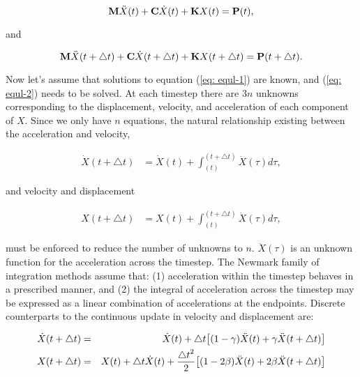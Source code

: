 \begin{equation}
{\bf M} \ddot{X}(t) + {\bf C} \dot{X}(t) + {\bf K} {X}(t) = {\bf P}(t),
\label{eq: equl-1}
\end{equation}

\vspace{0.01 in}\noindent
and

\begin{equation}
{\bf M} \ddot{X}(t+\triangle t) + {\bf C} \dot{X}(t+\triangle t) +
{\bf K}      {X}(t+\triangle t) = {\bf P}(t+\triangle t).
\label{eq: equl-2}
\end{equation}

\vspace{0.05 in}\noindent
Now let's assume that solutions to equation (\ref{eq: equl-1}) are known,
and (\ref{eq: equl-2}) needs to be solved.
At each timestep there are $3n$ unknowns corresponding to
the displacement, velocity, and acceleration of each component of $X$.
Since we only have $n$ equations, the natural relationship existing between the
acceleration and velocity,

\begin{eqnarray}
{\dot X} (t+\triangle t) &= {\dot X}(t) + \int_{(t)}^{(t+\triangle t)} {\ddot X}(\tau) d \tau,
\end{eqnarray}

\vspace{0.05 in}\noindent
and velocity and displacement

\begin{eqnarray}
{X} (t+\triangle t) &= {X}(t) + \int_{(t)}^{(t+\triangle t)} {\dot  X}(\tau) d \tau,
\end{eqnarray}

\vspace{0.05 in}\noindent
must be enforced to reduce the number of unknowns to $n$.
${\ddot X}(\tau)$ is an unknown function for the acceleration across the timestep.
The Newmark family of integration methods assume that:
(1) acceleration within the timestep behaves in a prescribed manner, and
(2) the integral of acceleration across the timestep may be expressed
as a linear combination of accelerations at the endpoints.
Discrete counterparts to the continuous update in velocity and displacement are:

\begin{eqnarray}
{\dot X}(t+\triangle t) &= &{\dot X}(t) +
{\triangle t} {\left[ (1-\gamma){{\ddot X}(t)} + \gamma {\ddot X}(t+\triangle t) \right]} \\
     {X}(t+\triangle t) &= &{X}(t) + {\triangle t} {\dot X}(t) +
{{{\triangle t}^2} \over 2} {\left[(1-2\beta){{\ddot X}(t)} + 2\beta {\ddot X}(t+\triangle t) \right]}
\end{eqnarray}

